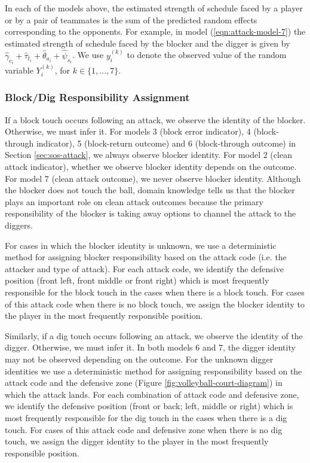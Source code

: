 \documentclass{article}
\begin{document}
In each of the models above, the estimated strength of schedule faced by a player or by a pair of teammates is the sum of the predicted random effects corresponding to the opponents. For example, in model (\ref{eqn:attack-model-7}) the estimated strength of schedule faced by the blocker and the digger is given by $\hat\gamma_{c_i} + \hat\tau_{t_i} + \hat\theta_{a_i} + \hat\psi_{s_i}$. We use $y_i^{(k)}$ to denote the observed value of the random variable $Y_i^{(k)}$, for $k \in \{1, ..., 7\}$.

\subsubsection{Block/Dig Responsibility Assignment}
\label{sec:block-dig-responsibility}

If a block touch occurs following an attack, we observe the identity of the blocker. Otherwise, we must infer it. For models 3 (block error indicator), 4 (block-through indicator), 5 (block-return outcome) and 6 (block-through outcome) in Section \ref{sec:sos-attack}, we always observe blocker identity. For model 2 (clean attack indicator), whether we observe blocker identity depends on the outcome. For model 7 (clean attack outcome), we never observe blocker identity. Although the blocker does not touch the ball, domain knowledge tells us that the blocker plays an important role on clean attack outcomes because the primary responsibility of the blocker is taking away options to channel the attack to the diggers.

For cases in which the blocker identity is unknown, we use a deterministic method for assigning blocker responsibility based on the attack code (i.e. the attacker and type of attack). For each attack code, we identify the defensive position (front left, front middle or front right) which is most frequently responsible for the block touch in the cases when there is a block touch. For cases of this attack code when there is no block touch, we assign the blocker identity to the player in the most frequently responsible position.

Similarly, if a dig touch occurs following an attack, we observe the identity of the digger. Otherwise, we must infer it. In both models 6 and 7, the digger identity may not be observed depending on the outcome. For the unknown digger identities we use a deterministic method for assigning responsibility based on the attack code and the defensive zone (Figure \ref{fig:volleyball-court-diagram}) in which the attack lands. For each combination of attack code and defensive zone, we identify the defensive position (front or back; left, middle or right) which is most frequently responsible for the dig touch in the cases when there is a dig touch. For cases of this attack code and defensive zone when there is no dig touch, we assign the digger identity to the player in the most frequently responsible position.
\end{document}
